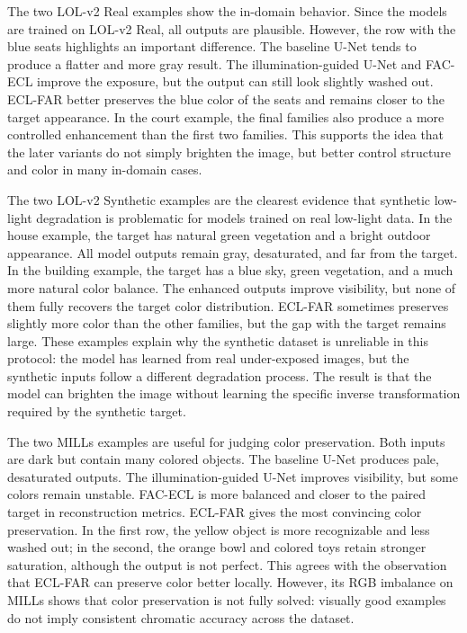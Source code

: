 

The two LOL-v2 Real examples show the in-domain behavior. Since the models are trained on LOL-v2 Real, all outputs are plausible. However, the row with the blue seats highlights an important difference. The baseline U-Net tends to produce a flatter and more gray result. The illumination-guided U-Net and FAC-ECL improve the exposure, but the output can still look slightly washed out. ECL-FAR better preserves the blue color of the seats and remains closer to the target appearance. In the court example, the final families also produce a more controlled enhancement than the first two families. This supports the idea that the later variants do not simply brighten the image, but better control structure and color in many in-domain cases.

The two LOL-v2 Synthetic examples are the clearest evidence that synthetic low-light degradation is problematic for models trained on real low-light data. In the house example, the target has natural green vegetation and a bright outdoor appearance. All model outputs remain gray, desaturated, and far from the target. In the building example, the target has a blue sky, green vegetation, and a much more natural color balance. The enhanced outputs improve visibility, but none of them fully recovers the target color distribution. ECL-FAR sometimes preserves slightly more color than the other families, but the gap with the target remains large. These examples explain why the synthetic dataset is unreliable in this protocol: the model has learned from real under-exposed images, but the synthetic inputs follow a different degradation process. The result is that the model can brighten the image without learning the specific inverse transformation required by the synthetic target.

The two MILLs examples are useful for judging color preservation. Both inputs are dark but contain many colored objects. The baseline U-Net produces pale, desaturated outputs. The illumination-guided U-Net improves visibility, but some colors remain unstable. FAC-ECL is more balanced and closer to the paired target in reconstruction metrics. ECL-FAR gives the most convincing color preservation. In the first row, the yellow object is more recognizable and less washed out; in the second, the orange bowl and colored toys retain stronger saturation, although the output is not perfect. This agrees with the observation that ECL-FAR can preserve color better locally. However, its RGB imbalance on MILLs shows that color preservation is not fully solved: visually good examples do not imply consistent chromatic accuracy across the dataset.

